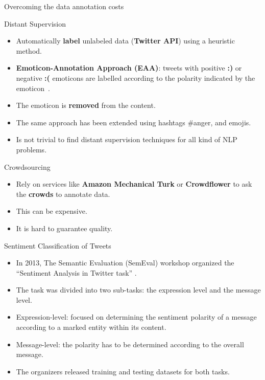 \documentclass[handout]{beamer}
\begin{document}
\begin{frame}{Overcoming the data annotation costs}
\begin{scriptsize}
\begin{block}{Distant Supervision}
  \begin{itemize}
   \item Automatically \textbf{label} unlabeled data (\textbf{Twitter API}) using a heuristic method.
   \item \textbf{Emoticon-Annotation Approach (EAA)}: tweets with positive \textcolor[rgb]{0.00,0.00,1.00}{\textbf{:)}} or negative \textcolor[rgb]{1.00,0.00,0.00}{\textbf{:(}} emoticons are labelled according to the polarity indicated by the emoticon~\cite{Read2005}.
  \item The emoticon is \textbf{removed} from the content.
  \item The same approach has been extended using hashtags \#anger, and emojis.
\item Is not trivial to find distant supervision techniques for all kind of NLP problems.
\end{itemize} 
 
\end{block}

\begin{block}{Crowdsourcing}
  \begin{itemize}
\item Rely on services like \textbf{Amazon Mechanical Turk} or \textbf{Crowdflower} to ask the \textbf{crowds} to annotate data.
\item This can be expensive.
\item It is hard to guarantee quality. 
   \end{itemize} 
 
\end{block}

\end{scriptsize}

\end{frame}




\begin{frame}{Sentiment Classification of Tweets}
\begin{scriptsize}
\begin{itemize}
\item In 2013, The Semantic Evaluation (SemEval) workshop organized the
``Sentiment Analysis in Twitter
task'' \cite{Semeval2013}.
 \item The task was divided into two sub-tasks: the expression
level and the message level. 
\item Expression-level: focused on determining
the sentiment polarity of a message according to a marked entity within its content.
\item Message-level: the polarity has to be determined according to
the overall message.
\item  The organizers released training and testing datasets
for both tasks.
\cite{Semeval2013}
\end{itemize}
\end{scriptsize}
\end{frame}
\end{document}
